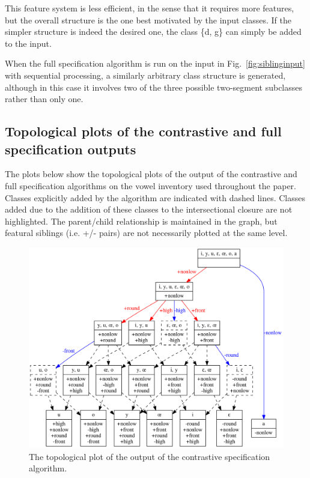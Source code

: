 \documentclass[11pt, oneside]{article}   	%
\begin{document}
This feature system is less efficient, in the sense that it requires more features, but the overall structure is the one best motivated by the input classes. If the simpler structure is indeed the desired one, the class \{d, g\} can simply be added to the input.

When the full specification algorithm is run on the input in Fig.~\ref{fig:siblinginput} with sequential processing, a similarly arbitrary class structure is generated, although in this case it involves two of the three possible two-segment subclasses rather than only one.

\subsection{Topological plots of the contrastive and full specification outputs}
\label{app:topological}

The plots below show the topological plots of the output of the contrastive and full specification algorithms on the vowel inventory used throughout the paper. Classes explicitly added by the algorithm are indicated with dashed lines. Classes added due to the addition of these classes to the intersectional closure are not highlighted. The parent/child relationship is maintained in the graph, but featural siblings (i.e. +/- pairs) are not necessarily plotted at the same level.
\begin{figure}[htb!]
	\centering
	\includegraphics[width=\textwidth]{vowel_inventory_contrastive_TOPOLOGICAL.png}
	\caption{The topological plot of the output of the contrastive specification algorithm.}
	\label{fig:vowelcontrastivetopological}
\end{figure}
\end{document}
